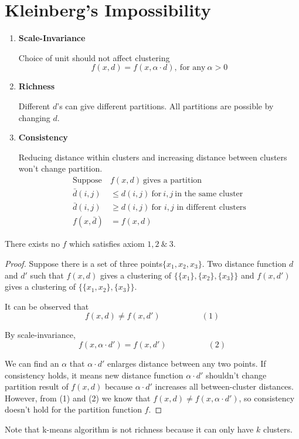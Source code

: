 \section{Kleinberg's Impossibility}
\begin{enumerate}
\item \textbf{Scale-Invariance}

  Choice of unit should not affect clustering
  $$f(x,d)=f(x,\alpha\cdot d),\ \text{for any}\ \alpha>0$$
\item \textbf{Richness}

  Different $d$'s can give different partitions. All partitions are
  possible by changing $d$.  
\item \textbf{Consistency}

  Reducing distance within clusters and increasing distance between
  clusters won't change partition. 
  \begin{align*}
    \text{Suppose}\ &f(x,d)\ \textrm{gives a partition}\\ 
    \bar{d}(i,j)&\leq
    d(i,j)\ \text{for}\ i,j\ \textrm{in the same cluster}\\ 
    \bar{d}(i,j)&\geq d(i,j)\ \textrm{for $i,j$ in different clusters}\\
    f(x,\bar{d})&=f(x,d)
  \end{align*}
\end{enumerate}
\begin{theorem}
  There exists no $f$ which satisfies axiom $1,2~\&~3$.
\end{theorem}

\begin{proof}
  Suppose there is a set of three points$\{x_1, x_2,x_3\}$. Two
  distance function $d$ and $d'$ such that $f(x,d)$ gives a clustering
  of $\{\{x_1\},\{x_2\},\{x_3\}\}$ and $f(x,d')$ gives a clustering of
  $\{\{x_1,x_2\},\{x_3\}\}$.
  
  It can be observed that $$f(x,d)\neq f(x,d')\hspace{5em}(1)$$
  
  By scale-invariance, $$f(x,\alpha\cdot d') =
  f(x,d')\hspace{5em}(2)$$
  
  We can find an $\alpha$ that $\alpha\cdot d'$ enlarges distance
  between any two points. If consistency holds, it means new distance
  function $\alpha\cdot d'$ shouldn't change partition result of
  $f(x,d)$ because $\alpha\cdot d'$ increases all between-cluster
  distances. However, from (1) and (2) we know that $f(x,d)\neq
  f(x,\alpha\cdot d')$, so consistency doesn't hold for the partition
  function $f$.
\end{proof}
Note that k-means algorithm is not richness because it can only have
$k$ clusters. 
